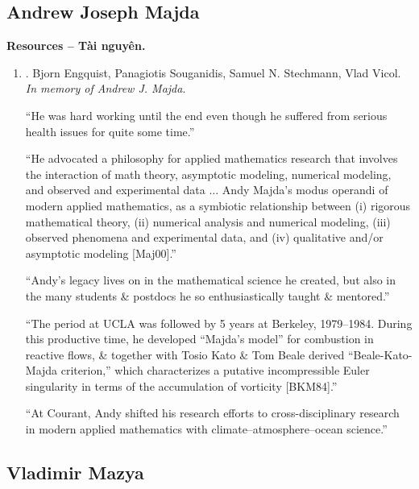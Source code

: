 \documentclass{article}
\begin{document}

\subsection{Andrew Joseph Majda}
\textbf{\textsf{Resources -- Tài nguyên.}}
\begin{enumerate}
	\item \cite{memory_Andrew_Joseph_Majda}. {\sc Bjorn Engquist, Panagiotis Souganidis, Samuel N. Stechmann, Vlad Vicol}. {\it In memory of Andrew J. Majda}.
	
	``He was hard working until the end even though he suffered from serious health issues for quite some time.''
	
	``He advocated a philosophy for applied mathematics research that involves the interaction of math theory, asymptotic modeling, numerical modeling, and observed and experimental data $\ldots$ Andy Majda's modus operandi of modern applied mathematics, as a symbiotic relationship between (i) rigorous mathematical theory, (ii) numerical analysis and numerical modeling, (iii) observed phenomena and experimental data, and (iv) qualitative and/or asymptotic modeling [Maj00].''
	
	``Andy's legacy lives on in the mathematical science he created, but also in the many students \& postdocs he so enthusiastically taught \& mentored.''
	
	``The period at UCLA was followed by 5 years at Berkeley, 1979--1984. During this productive time, he developed ``Majda's model'' for combustion in reactive flows, \& together with Tosio Kato \& Tom Beale derived ``Beale-Kato-Majda criterion,'' which characterizes a putative incompressible Euler singularity in terms of the accumulation of vorticity [BKM84].''
	
	``At Courant, Andy shifted his research efforts to cross-disciplinary research in modern applied mathematics with climate--atmosphere--ocean science.''
\end{enumerate}


\subsection{Vladimir Mazya}

\end{document}
